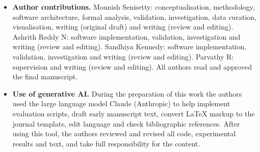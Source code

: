 \begin{itemize}
\ifanonymous\else
\item \textbf{Author contributions.} Mounish Senisetty: conceptualisation, methodology, software architecture, formal analysis, validation, investigation, data curation, visualisation, writing (original draft) and writing (review and editing). Ashrith Reddy N: software implementation, validation, investigation and writing (review and editing). Sandhiya Kennedy: software implementation, validation, investigation and writing (review and editing). Parvathy R: supervision and writing (review and editing). All authors read and approved the final manuscript.
\fi
\item \textbf{Use of generative AI.} During the preparation of this work the authors used the large language model Claude (Anthropic) to help implement evaluation scripts, draft early manuscript text, convert \LaTeX{} markup to the journal template, edit language and check bibliographic references. After using this tool, the authors reviewed and revised all code, experimental results and text, and take full responsibility for the content.
\end{itemize}
